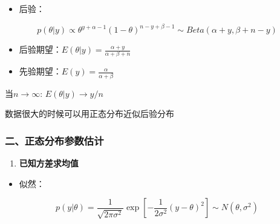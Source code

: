\begin{itemize}
\item
  后验：
\end{itemize}

\[p(\theta|y)\propto \theta^{y+\alpha-1}(1-\theta)^{n-y+\beta-1}\sim Beta(\alpha+y,\beta+n-y)\]

\begin{itemize}
\item
  后验期望：\(E(\theta|y)=\frac{\alpha+y}{\alpha+\beta+n}\)
\item
  先验期望：\(E(y)=\frac{\alpha}{\alpha+\beta}\)
\end{itemize}

当\(n\rightarrow\infty\): \(E(\theta|y)\rightarrow y/n\)

数据很大的时候可以用正态分布近似后验分布

\hypertarget{ux4e8cux6b63ux6001ux5206ux5e03ux53c2ux6570ux4f30ux8ba1}{%
\subsubsection{二、正态分布参数估计}\label{ux4e8cux6b63ux6001ux5206ux5e03ux53c2ux6570ux4f30ux8ba1}}

\begin{enumerate}
\def\labelenumi{\arabic{enumi}.}
\item
  \textbf{已知方差求均值}
\end{enumerate}

\begin{itemize}
\item
  似然：
\end{itemize}

\[p(y|\theta)=\frac{1}{\sqrt{2\pi\sigma^2}}\exp\left[-\frac{1}{2\sigma^2}(y-\theta)^2\right]\sim N(\theta,\sigma^2)\]

